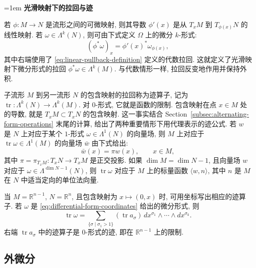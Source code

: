 \begingroup\emergencystretch=1em
\medskip\noindent\textbf{{光滑映射下的拉回与迹}}\par
{若 $\phi:M\to N$ 是流形之间的可微映射, 则其导数 $\phi'(x)$ 是从 $T_xM$ 到 $T_{\phi(x)}N$ 的线性映射. 若 $\omega\in\Lambda^k(N)$, 则可由下式定义 $\Omega$ 上的微分 $k$-形式:}
\begin{equation}\label{eq:smooth-pullback-definition}
(\phi^*\omega)_x=\phi'(x)^*\omega_{\phi(x)},
\end{equation}
{其中右端使用了 \eqref{eq:linear-pullback-definition} 定义的代数拉回. 这就定义了光滑映射下微分形式的拉回 $\phi^*\omega\in\Lambda^k(M)$. 与代数情形一样, 拉回反变地作用并保持外积.}

\par\endgroup
{子流形 $M$ 到另一流形 $N$ 的包含映射的拉回称为迹算子, 记为 $\operatorname{tr}:\Lambda^k(N)\to\Lambda^k(M)$. 对 $0$-形式, 它就是函数的限制. 包含映射在点 $x\in M$ 处的导数, 就是 $T_xM\subset T_xN$ 的包含映射. 这一事实结合 Section~\ref{subsec:alternating-form-operations} 末尾的计算, 给出了两种重要情形下用代理表示的迹公式. 若 $w$ 是 $N$ 上对应于某个 $1$-形式 $\omega\in\Lambda^1(N)$ 的向量场, 则 $M$ 上对应于 $\operatorname{tr}\omega\in\Lambda^1(M)$ 的向量场 $\bar w$ 由下式给出:}
\[
\bar w(x)=\pi w(x),\qquad x\in M,
\]
{其中 $\pi=\pi_{T_xM}:T_xN\to T_xM$ 是正交投影. 如果 $\dim M=\dim N-1$, 且向量场 $w$ 对应于 $\omega\in\Lambda^{\dim N-1}(N)$, 则 $\operatorname{tr}\omega$ 对应于 $M$ 上的标量函数 $\langle w,n\rangle$, 其中 $n$ 是 $M$ 在 $N$ 中适当定向的单位法向量.}

{当 $M=\mathbb R^{n-1}$, $N=\mathbb R^n$, 且包含映射为 $x\mapsto(0,x)$ 时, 可用坐标写出相应的迹算子. 若 $\omega$ 是 \eqref{eq:differential-form-coordinates} 给出的微分形式, 则}
\begin{equation}\label{eq:differential-trace-coordinates}
\operatorname{tr}\omega=\sum_{\{\sigma\mid\sigma_1>1\}}(\operatorname{tr}a_\sigma)\,dx^{\sigma_1}\wedge\cdots\wedge dx^{\sigma_k}.
\end{equation}
{右端 $\operatorname{tr}a_\sigma$ 中的迹算子是 $0$-形式的迹, 即在 $\mathbb R^{n-1}$ 上的限制.}

\subsection{{外微分}}\label{subsec:exterior-derivative}

